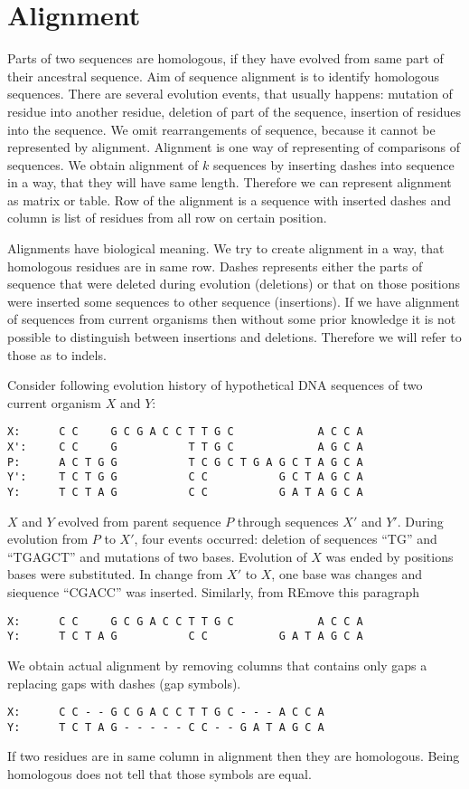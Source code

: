 \chapter{Alignment}

Parts of two sequences are homologous, if they have evolved from same part of
their ancestral sequence. Aim of sequence alignment is to identify homologous
sequences. There are several evolution events, that usually happens:
mutation of residue into another residue, deletion of part of the sequence,
insertion of residues into the sequence. We omit rearrangements of sequence,
because it cannot be represented by alignment. Alignment is one way of
representing of comparisons of sequences. We obtain alignment of $k$
sequences by inserting dashes into sequence in a way, that they will have same
length. Therefore we can represent alignment as matrix or table. Row of the
alignment is a sequence with inserted dashes and column is list of residues from
all row on certain position.

Alignments have biological meaning. We try to create alignment in a way, that
homologous residues are in same row. Dashes represents either the parts of
sequence that were deleted during evolution (deletions) or that on those
positions were inserted some sequences to other sequence (insertions). If we
have alignment of sequences from current organisms then without some prior
knowledge it is not possible to distinguish between insertions and deletions.
Therefore we will refer to those as to indels.

\begin{example} 
Consider following evolution history of hypothetical DNA sequences of two current organism $X$ and $Y$:
\begin{verbatim}
X:      C C     G C G A C C T T G C             A C C A
X':     C C     G           T T G C             A G C A
P:      A C T G G           T C G C T G A G C T A G C A
Y':     T C T G G           C C           G C T A G C A
Y:      T C T A G           C C           G A T A G C A
\end{verbatim}
$X$ and $Y$ evolved from parent sequence $P$ through sequences $X'$ and $Y'$.
During evolution from $P$ to $X'$, four events occurred: deletion of 
sequences ``TG''  and ``TGAGCT'' and mutations of two bases. Evolution of $X$
was ended by  
positions bases were substituted. In change from $X'$ to $X$, one base was
changes and siequence ``CGACC'' was inserted.  Similarly, from 
REmove this paragraph

\begin{verbatim}
X:      C C     G C G A C C T T G C             A C C A
Y:      T C T A G           C C           G A T A G C A
\end{verbatim}
We obtain actual alignment by removing columns that contains only gaps a
replacing gaps with dashes (gap symbols). 
\begin{verbatim}
X:      C C - - G C G A C C T T G C - - - A C C A
Y:      T C T A G - - - - - C C - - G A T A G C A
\end{verbatim}
If two residues are in same column in alignment then they are homologous.
Being homologous does not tell that those symbols are equal. 
\end{example}

